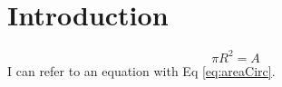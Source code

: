 \documentclass[12pt]{article}
\begin{document}
\maketitle

\section*{Introduction}


\begin{equation}\label{eq:areaCirc}
	\pi R^2 = A
\end{equation}
I can refer to an equation with Eq \eqref{eq:areaCirc}. 

\begin{comment}
I've commented out this section to show you how to add a figure. Delete the lines "begin comment" and "end comment" to include this, but you'll have to have a file called "blank.eps" or change the name of the file to the name of your figure to include in the same folder.
\begin{figure}[h]
	\centering
	\texttt{[image: blank.eps]}
	\caption{Template for a figure, you will need to add the figure.}
	\label{fig:blank}
\end{figure}
I refer to a figure with \ref{fig:blank}.
\end{comment}
\end{document}
